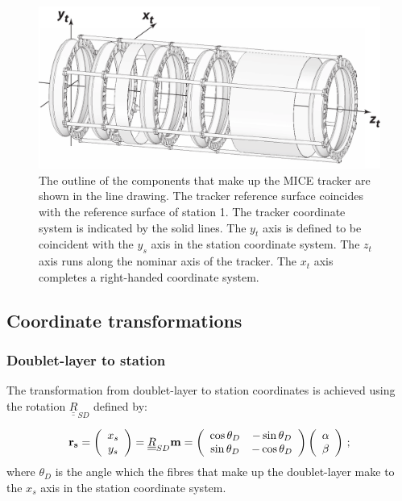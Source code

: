 \begin{figure}
  \begin{center}
    \includegraphics[width=0.7\linewidth]{detectors/tracker/03-Reference-surfaces-and-coordinate-systems/Figures/tracker.pdf}
  \end{center}
  \caption{ The outline of the components that make up the MICE tracker are shown in the line drawing. The tracker reference surface coincides with the reference surface of station 1. The tracker coordinate system is indicated by the solid lines. The $y_t$ axis is defined to be coincident with the $y_s$ axis in the station coordinate system.  The $z_t$ axis runs along the nominar axis of the tracker. The $x_t$ axis completes a right-handed coordinate system. }
  \label{Fig:TrkRef&Coord}
\end{figure}

\subsection{Coordinate transformations}
\label{SubSect:CoordTran}

\subsubsection{Doublet-layer to station}
\label{SubSubSect:DblStn}

The transformation from doublet-layer to station coordinates is achieved using the rotation $\underline{\underline{R}}_{SD}$ defined by: 

\begin{equation}
  {\bf r_s} = 
    \left(
        \begin{array}{c}
           x_s                                                      \\
           y_s
        \end{array}
    \right) = \underline{\underline{R}}_{SD} {\bf m} =
    \left(
        \begin{array}{cc}
           \cos \theta_D & -\sin \theta_D                           \\
           \sin \theta_D & -\cos \theta_D
        \end{array}
    \right) 
    \left(
        \begin{array}{c}
           \alpha                                                   \\
           \beta
        \end{array}
    \right) \, ;
\end{equation}
where $\theta_D$ is the angle which the fibres that make up the doublet-layer make to the $x_s$ axis in the station coordinate system.
